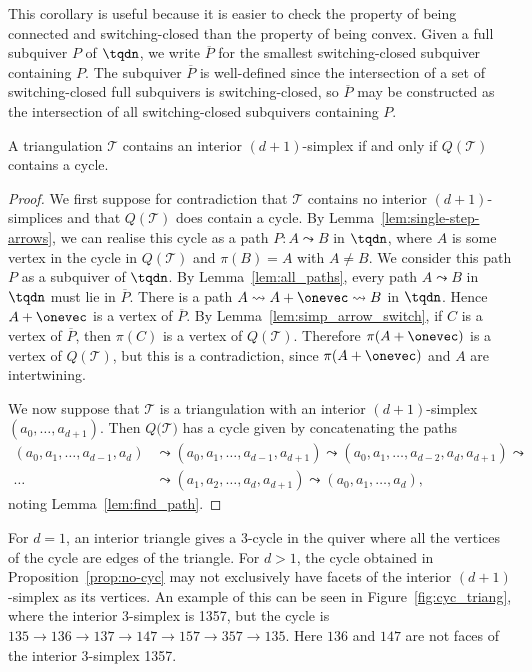 This corollary is useful because it is easier to check the property of being connected and switching-closed than the property of being convex. Given a full subquiver $P$ of $\tqdn$, we write $\overline{P}$ for the smallest switching-closed subquiver containing $P$. The subquiver $\overline{P}$ is well-defined since the intersection of a set of switching-closed full subquivers is switching-closed, so $\overline{P}$ may be constructed as the intersection of all switching-closed subquivers containing $P$.

\begin{prop}\label{prop:no-cyc}
A triangulation $\mathcal{T}$ contains an interior $(d+1)$-simplex if and only if $Q(\mathcal{T})$ contains a cycle.
\end{prop}
\begin{proof}
We first suppose for contradiction that $\mathcal{T}$ contains no interior $(d+1)$-simplices and that $Q(\mathcal{T})$ does contain a cycle. By Lemma~\ref{lem:single-step-arrows}, we can realise this cycle as a path $P \colon A \leadsto B$ in $\tqdn$, where $A$ is some vertex in the cycle in $Q(\mathcal{T})$ and $\pi(B) = A$ with $A \neq B$. We consider this path $P$ as a subquiver of $\tqdn$. By Lemma~\ref{lem:all_paths}, every path $A \leadsto B$ in $\tqdn$ must lie in $\overline{P}$. There is a path $A \leadsto A + \onevec \leadsto B$ in $\tqdn$. Hence $A + \onevec$ is a vertex of $\overline{P}$. By Lemma~\ref{lem:simp_arrow_switch}, if $C$ is a vertex of $\overline{P}$, then $\pi(C)$ is a vertex of $Q(\mathcal{T})$. Therefore $\pi(A + \onevec)$ is a vertex of $Q(\mathcal{T})$, but this is a contradiction, since $\pi(A + \onevec)$ and $A$ are intertwining.

We now suppose that $\mathcal{T}$ is a triangulation with an interior $(d + 1)$-simplex  $(a_{0}, \dots, a_{d + 1})$. Then $Q(\mathcal{T)}$ has a cycle given by concatenating the paths
\begin{align*}
(a_{0}, a_{1}, \dots, a_{d - 1}, a_{d}) &\leadsto (a_{0}, a_{1}, \dots , a_{d - 1}, a_{d + 1}) \leadsto (a_{0}, a_{1}, \dots, a_{d - 2}, a_{d}, a_{d + 1}) \leadsto \\
 \dots &\leadsto (a_{1}, a_{2}, \dots, a_{d}, a_{d + 1}) \leadsto (a_{0}, a_{1}, \dots , a_{d}),
\end{align*}
noting Lemma~\ref{lem:find_path}.
\end{proof}

\begin{rema}
For $d = 1$, an interior triangle gives a 3-cycle in the quiver where all the vertices of the cycle are edges of the triangle. For $d > 1$, the cycle obtained in Proposition~\ref{prop:no-cyc} may not exclusively have facets of the interior $(d + 1)$-simplex as its vertices. An example of this can be seen in Figure~\ref{fig:cyc_triang}, where the interior 3-simplex is 1357, but the cycle is $135 \to 136 \to 137 \to 147 \to 157 \to 357 \to 135$. Here $136$ and $147$ are not faces of the interior 3-simplex 1357.
\end{rema}

